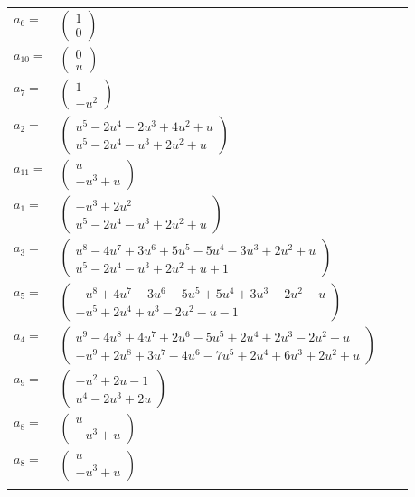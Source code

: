 \documentclass[1p]{elsarticle_modified}
\theoremstyle{definition}
\begin{document}
\begin{tabular}{m{7pt} m{180pt} m{7pt} m{180pt} }
\flushright $a_{6}=$&$\begin{pmatrix}1\\0\end{pmatrix}$ \\
\flushright $a_{10}=$&$\begin{pmatrix}0\\u\end{pmatrix}$ \\
\flushright $a_{7}=$&$\begin{pmatrix}1\\- u^2\end{pmatrix}$ \\
\flushright $a_{2}=$&$\begin{pmatrix}u^5-2 u^4-2 u^3+4 u^2+u\\u^5-2 u^4- u^3+2 u^2+u\end{pmatrix}$ \\
\flushright $a_{11}=$&$\begin{pmatrix}u\\- u^3+u\end{pmatrix}$ \\
\flushright $a_{1}=$&$\begin{pmatrix}- u^3+2 u^2\\u^5-2 u^4- u^3+2 u^2+u\end{pmatrix}$ \\
\flushright $a_{3}=$&$\begin{pmatrix}u^8-4 u^7+3 u^6+5 u^5-5 u^4-3 u^3+2 u^2+u\\u^5-2 u^4- u^3+2 u^2+u+1\end{pmatrix}$ \\
\flushright $a_{5}=$&$\begin{pmatrix}- u^8+4 u^7-3 u^6-5 u^5+5 u^4+3 u^3-2 u^2- u\\- u^5+2 u^4+u^3-2 u^2- u-1\end{pmatrix}$ \\
\flushright $a_{4}=$&$\begin{pmatrix}u^9-4 u^8+4 u^7+2 u^6-5 u^5+2 u^4+2 u^3-2 u^2- u\\- u^9+2 u^8+3 u^7-4 u^6-7 u^5+2 u^4+6 u^3+2 u^2+u\end{pmatrix}$ \\
\flushright $a_{9}=$&$\begin{pmatrix}- u^2+2 u-1\\u^4-2 u^3+2 u\end{pmatrix}$ \\
\flushright $a_{8}=$&$\begin{pmatrix}u\\- u^3+u\end{pmatrix}$\\ \flushright $a_{8}=$&$\begin{pmatrix}u\\- u^3+u\end{pmatrix}$\\&\end{tabular}
\end{document}
